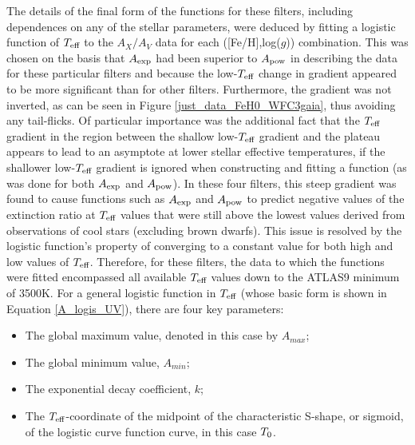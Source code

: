 \documentclass[12pt, a4paper]{report}
\begin{document}
The details of the final form of the functions for these filters, including dependences on any of the stellar parameters, were deduced by fitting a logistic function of $T_{\textnormal{eff}}$ to the $A_{X}/A_{V}$ data for each ([Fe/H],log($g$)) combination. This was chosen on the basis that $A_{\textnormal{exp}}$ had been superior to $A_{\textnormal{pow}}$ in describing the data for these particular filters and because the low-$T_{\textnormal{eff}}$ change in gradient appeared to be more significant than for other filters. Furthermore, the gradient was not inverted, as can be seen in Figure \ref{just_data_FeH0_WFC3gaia}, thus avoiding any tail-flicks. Of particular importance was the additional fact that the $T_{\textnormal{eff}}$ gradient in the region between the shallow low-$T_{\textnormal{eff}}$ gradient and the plateau appears to lead to an asymptote at lower stellar effective temperatures, if the shallower low-$T_{\textnormal{eff}}$ gradient is ignored when constructing and fitting a function (as was done for both $A_{\textnormal{exp}}$ and $A_{\textnormal{pow}}$). In these four filters, this steep gradient was found to cause functions such as $A_{\textnormal{exp}}$ and $A_{\textnormal{pow}}$ to predict negative values of the extinction ratio at $T_{\textnormal{eff}}$ values that were still above the lowest values derived from observations of cool stars (excluding brown dwarfs). This issue is resolved by the logistic function's property of converging to a constant value for both high and low values of $T_{\textnormal{eff}}$. Therefore, for these filters, the data to which the functions were fitted encompassed all available $T_{\textnormal{eff}}$ values down to the ATLAS9 minimum of 3500K. For a general logistic function in $T_{\textnormal{eff}}$ (whose basic form is shown in Equation \ref{A_logis_UV}), there are four key parameters:

\begin{itemize}
\item The global maximum value, denoted in this case by $A_{max}$;
\item The global minimum value, $A_{min}$;
\item The exponential decay coefficient, $k$;
\item The $T_{\textnormal{eff}}$-coordinate of the midpoint of the characteristic S-shape, or sigmoid, of the logistic curve function curve, in this case $T_{\textnormal{0}}$.
\end{itemize}
\end{document}
